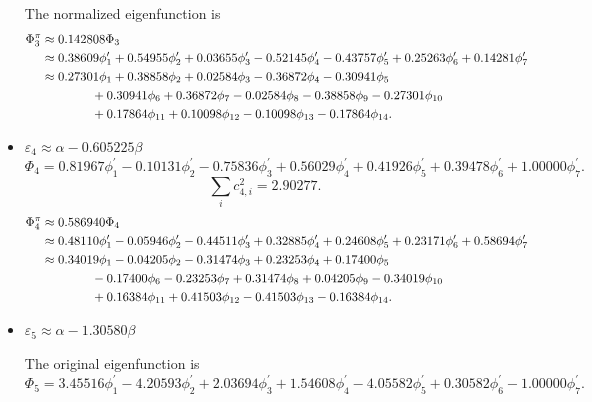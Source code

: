 \begin{itemize}
		The normalized eigenfunction is
		\begin{align}
			\Phi^\pi_3 &\approx 0.142808 \Phi_3 \notag \\
			&\approx 0.38609 \phi^\prime_1 + 0.54955 \phi^\prime_2 +0.03655 \phi^\prime_3 -0.52145 \phi^\prime_4 - 0.43757 \phi^\prime_5 + 0.25263 \phi^\prime_6 + 0.14281 \phi^\prime_7 \notag \\
			&\approx 0.27301\phi_1 +0.38858 \phi_2 +0.02584 \phi_3 -0.36872 \phi_4 -0.30941 \phi_5  \notag \\
			&\hspace*{4em} +0.30941 \phi_6 + 0.36872 \phi_7 -0.02584 \phi_8 -0.38858 \phi_9 -0.27301 \phi_{10} \notag \\
			&\hspace*{4em} +0.17864 \phi_{11} +0.10098 \phi_{12} -0.10098\phi_{13} -0.17864 \phi_{14} .
		\end{align}
		
		
		\item $\varepsilon_4 \approx \alpha - 0.605225 \beta$
		\begin{equation*}
			\Phi_4 = 0.81967 \phi^\prime_1 -0.10131 \phi^\prime_2 -0.75836 \phi^\prime_3 + 0.56029 \phi^\prime_4 + 0.41926 \phi^\prime_5 + 0.39478 \phi^\prime_6 + 1.00000 \phi^\prime_7.
		\end{equation*}
		\begin{equation*}
			\sum_{i} c^2_{4,i} = 2.90277.
		\end{equation*}
		\begin{align}
			\Phi^\pi_4 &\approx 0.586940 \Phi_4 \notag \\
			&\approx 0.48110 \phi^\prime_1 - 0.05946 \phi^\prime_2 -0.44511 \phi^\prime_3 +0.32885 \phi^\prime_4 + 0.24608 \phi^\prime_5 + 0.23171 \phi^\prime_6 + 0.58694 \phi^\prime_7 \notag \\
			&\approx 0.34019 \phi_1 -0.04205 \phi_2 -0.31474 \phi_3 + 0.23253 \phi_4 + 0.17400 \phi_5  \notag \\
			&\hspace*{4em} -0.17400 \phi_6 -0.23253 \phi_7 +0.31474 \phi_8 +0.04205 \phi_9 -0.34019 \phi_{10} \notag \\
			&\hspace*{4em} +0.16384 \phi_{11} + 0.41503 \phi_{12} -0.41503 \phi_{13} -0.16384\phi_{14} .
		\end{align}
		
		
		\item $\varepsilon_5 \approx \alpha -1.30580 \beta$
		
		The original eigenfunction is
		\begin{equation*}
			\Phi_5 = 3.45516 \phi^\prime_1 - 4.20593 \phi^\prime_2 + 2.03694 \phi^\prime_3 + 1.54608 \phi^\prime_4 - 4.05582 \phi^\prime_5 + 0.30582 \phi^\prime_6 - 1.00000 \phi^\prime_7.
		\end{equation*}
		

\end{itemize}
